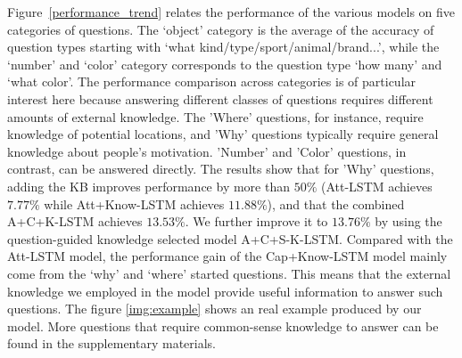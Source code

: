 Figure~\ref{performance_trend} relates the performance of the various models on five categories of questions. The `object' category is the average of the accuracy of question types starting with `what kind/type/sport/animal/brand...', while the `number' and `color' category corresponds to the question type `how many' and `what color'. The performance comparison across categories is of particular interest here because answering different classes of questions requires different amounts of external knowledge.  The 'Where' questions, for instance, require knowledge of potential locations, and 'Why' questions typically require general knowledge about people's motivation. 'Number' and 'Color' questions, in contrast, can be answered directly. The results show that for 'Why' questions, adding the KB improves performance by more than $50\%$ (Att-LSTM achieves $7.77\%$ while Att+Know-LSTM achieves $11.88\%$), and that the combined A+C+K-LSTM achieves $13.53\%$. We further improve it to $13.76\%$ by using the question-guided knowledge selected model A+C+S-K-LSTM. Compared with the Att-LSTM model, the performance gain of the Cap+Know-LSTM model mainly come from the `why' and `where' started questions. This means that the external knowledge we employed in the model provide useful information to answer such questions. The figure \ref{img:example} shows an real example produced by our model. More questions that require common-sense knowledge to answer can be found in the supplementary materials.

